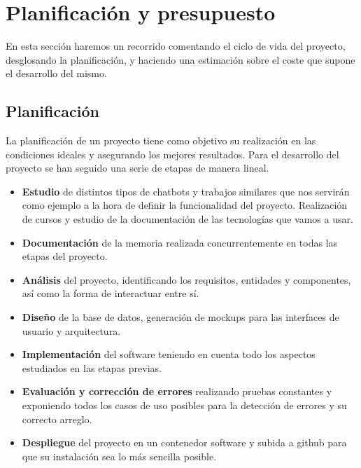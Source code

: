 \chapter{Planificación y presupuesto}

En esta sección haremos un recorrido comentando el ciclo de vida del proyecto, desglosando la planificación, y haciendo una estimación sobre el coste que supone el desarrollo del mismo.\vspace{0.3cm}

\section{Planificación}

La planificación de un proyecto tiene como objetivo su realización en las condiciones ideales y asegurando los mejores resultados. Para el desarrollo del proyecto se han seguido una serie de etapas de manera lineal. 

\begin{itemize}
    \item \textbf{Estudio} de distintos tipos de chatbots y trabajos similares que nos servirán como ejemplo a la hora de definir la funcionalidad del proyecto. Realización de cursos y estudio de la documentación de las tecnologías que vamos a usar.
    \item \textbf{Documentación} de la memoria realizada concurrentemente en todas las etapas del proyecto. 
    \item \textbf{Análisis} del proyecto, identificando los requisitos, entidades y componentes, así como la forma de interactuar entre sí. 
    \item \textbf{Diseño} de la base de datos, generación de mockups para las interfaces de usuario y arquitectura. 
    \item \textbf{Implementación} del software teniendo en cuenta todo los aspectos estudiados en las etapas previas.
    \item \textbf{Evaluación y corrección de errores} realizando pruebas constantes y exponiendo todos los casos de uso posibles para la detección de errores y su correcto arreglo. 
    \vspace{0.3cm}
    \item \textbf{Despliegue} del proyecto en un contenedor software y subida a github para que su instalación sea lo más sencilla posible. 
    
\end{itemize}\vspace{0.5cm}

